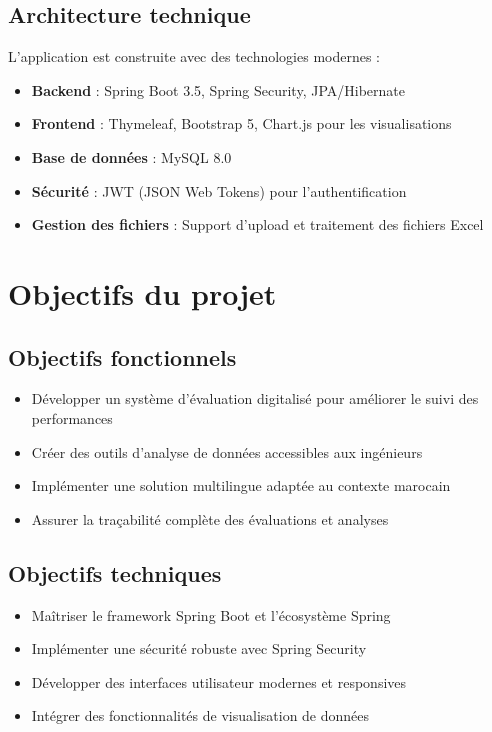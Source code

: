 \subsection{Architecture technique}

L'application est construite avec des technologies modernes :

\begin{itemize}
    \item \textbf{Backend} : Spring Boot 3.5, Spring Security, JPA/Hibernate
    \item \textbf{Frontend} : Thymeleaf, Bootstrap 5, Chart.js pour les visualisations
    \item \textbf{Base de données} : MySQL 8.0
    \item \textbf{Sécurité} : JWT (JSON Web Tokens) pour l'authentification
    \item \textbf{Gestion des fichiers} : Support d'upload et traitement des fichiers Excel
\end{itemize}

\section{Objectifs du projet}

\subsection{Objectifs fonctionnels}

\begin{itemize}
    \item Développer un système d'évaluation digitalisé pour améliorer le suivi des performances
    \item Créer des outils d'analyse de données accessibles aux ingénieurs
    \item Implémenter une solution multilingue adaptée au contexte marocain
    \item Assurer la traçabilité complète des évaluations et analyses
\end{itemize}

\subsection{Objectifs techniques}

\begin{itemize}
    \item Maîtriser le framework Spring Boot et l'écosystème Spring
    \item Implémenter une sécurité robuste avec Spring Security
    \item Développer des interfaces utilisateur modernes et responsives
    \item Intégrer des fonctionnalités de visualisation de données
\end{itemize}

